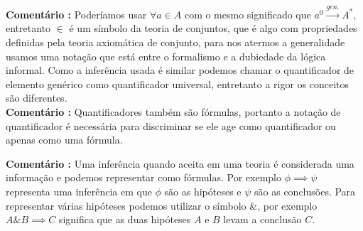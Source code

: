 \documentclass[10pt,a4paper]{report}
\begin{document}
\textbf{Comentário :} Poderíamos usar $\forall a \in A$ com o mesmo significado que $a^0 \overset{gen.}{\rightarrow} A^{*}$, entretanto $\in$ é um símbolo da teoria de conjuntos, que é algo com propriedades definidas pela teoria axiomática de conjunto, para nos atermos a generalidade usamos uma notação que está entre o formalismo e a dubiedade da lógica informal. Como a inferência usada é similar podemos chamar o quantificador de elemento genérico como quantificador universal, entretanto a rigor os conceitos são diferentes.\\

\textbf{Comentário :} Quantificadores também são fórmulas, portanto a notação de quantificador é necessária para discriminar se ele age como quantificador ou apenas como uma fórmula.

\hspace{\baselineskip}



\textbf{Comentário :} Uma inferência quando aceita em uma teoria é considerada uma informação e podemos representar como fórmulas. Por exemplo $\phi \implies \psi$ representa uma inferência em que $\phi$ são as hipóteses e $\psi$ são as conclusões. Para representar várias hipóteses podemos utilizar o símbolo $\&$, por exemplo $A \& B \implies C$ significa que as duas hipóteses $A$ e $B$ levam a conclusão $C$.

\hspace{\baselineskip}
\end{document}

